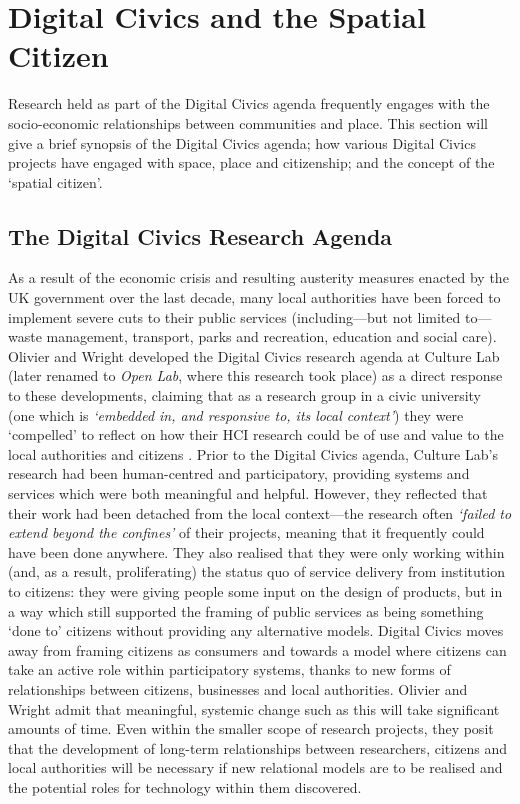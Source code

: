 \section{Digital Civics and the Spatial Citizen}
\label{sec:DigitalCivics}
Research held as part of the Digital Civics agenda frequently engages with the socio-economic relationships between communities and place. This section will give a brief synopsis of the Digital Civics agenda; how various Digital Civics projects have engaged with space, place and citizenship; and the concept of the `spatial citizen'.

\subsection{The Digital Civics Research Agenda}

As a result of the economic crisis and resulting austerity measures enacted by the UK government over the last decade, many local authorities have been forced to implement severe cuts to their public services (including---but not limited to---waste management, transport, parks and recreation, education and social care). Olivier and Wright developed the Digital Civics research agenda at Culture Lab (later renamed to \textit{Open Lab}, where this research took place) as a direct response to these developments, claiming that as a research group in a civic university (one which is \textit{`embedded in, and responsive to, its local context'}) they were `compelled' to reflect on how their HCI research could be of use and value to the local authorities and citizens \citep{Olivier2015}. Prior to the Digital Civics agenda, Culture Lab's research had been human-centred and participatory, providing systems and services which were both meaningful and helpful. However, they reflected that their work had been detached from the local context---the research often \textit{`failed to extend beyond the confines'} of their projects, meaning that it frequently could have been done anywhere. They also realised that they were only working within (and, as a result, proliferating) the status quo of service delivery from institution to citizens: they were giving people some input on the design of products, but in a way which still supported the framing of public services as being something `done to' citizens without providing any alternative models. Digital Civics moves away from framing citizens as consumers and towards a model where citizens can take an active role within participatory systems, thanks to new forms of relationships between citizens, businesses and local authorities. Olivier and Wright admit that meaningful, systemic change such as this will take significant amounts of time. Even within the smaller scope of research projects, they posit that the development of long-term relationships between researchers, citizens and local authorities will be necessary if new relational models are to be realised and the potential roles for technology within them discovered.

